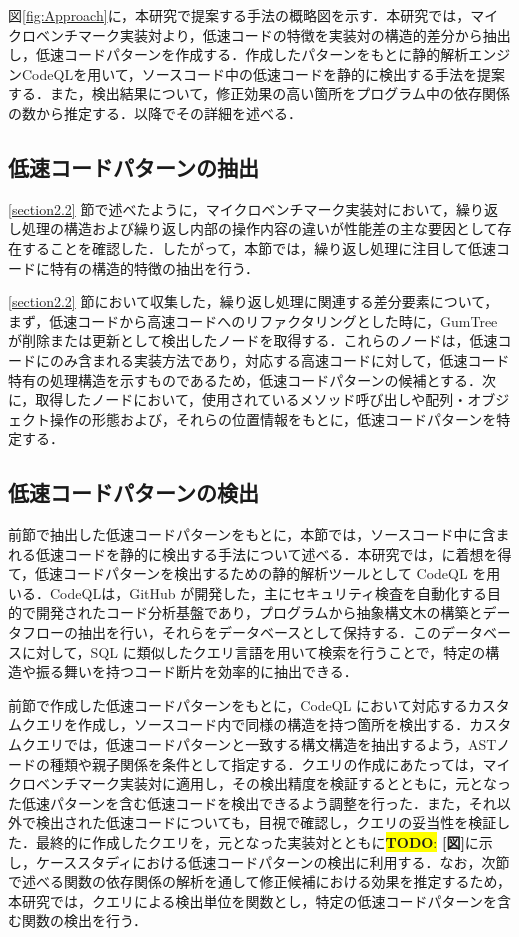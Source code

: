\documentclass[submit,techrep,noauthor]{ipsj}
\newcommand{\todo}[1]{\colorbox{yellow}{{\bf TODO}:}{\color{red} {\textbf{[#1]}}}}
\begin{document}
図\ref{fig:Approach}に，本研究で提案する手法の概略図を示す．本研究では，マイクロベンチマーク実装対より，低速コードの特徴を実装対の構造的差分から抽出し，低速コードパターンを作成する．作成したパターンをもとに静的解析エンジンCodeQL\cite{ql}を用いて，ソースコード中の低速コードを静的に検出する手法を提案する．また，検出結果について，修正効果の高い箇所をプログラム中の依存関係の数から推定する．以降でその詳細を述べる．


\subsection{低速コードパターンの抽出}

\ref{section2.2} 節で述べたように，マイクロベンチマーク実装対において，繰り返し処理の構造および繰り返し内部の操作内容の違いが性能差の主な要因として存在することを確認した．したがって，本節では，繰り返し処理に注目して低速コードに特有の構造的特徴の抽出を行う．

\ref{section2.2} 節において収集した，繰り返し処理に関連する差分要素について，まず，低速コードから高速コードへのリファクタリングとした時に，GumTree\cite{gumtree} が削除または更新として検出したノードを取得する．これらのノードは，低速コードにのみ含まれる実装方法であり，対応する高速コードに対して，低速コード特有の処理構造を示すものであるため，低速コードパターンの候補とする．次に，取得したノードにおいて，使用されているメソッド呼び出しや配列・オブジェクト操作の形態および，それらの位置情報をもとに，低速コードパターンを特定する．


\subsection{低速コードパターンの検出}

前節で抽出した低速コードパターンをもとに，本節では，ソースコード中に含まれる低速コードを静的に検出する手法について述べる．本研究では，\cite{DrAsync}に着想を得て，低速コードパターンを検出するための静的解析ツールとして CodeQL\cite{ql} を用いる．CodeQLは，GitHub が開発した，主にセキュリティ検査を自動化する目的で開発されたコード分析基盤であり，プログラムから抽象構文木の構築とデータフローの抽出を行い，それらをデータベースとして保持する．このデータベースに対して，SQL に類似したクエリ言語を用いて検索を行うことで，特定の構造や振る舞いを持つコード断片を効率的に抽出できる．

前節で作成した低速コードパターンをもとに，CodeQL において対応するカスタムクエリを作成し，ソースコード内で同様の構造を持つ箇所を検出する．カスタムクエリでは，低速コードパターンと一致する構文構造を抽出するよう，ASTノードの種類や親子関係を条件として指定する．クエリの作成にあたっては，マイクロベンチマーク実装対に適用し，その検出精度を検証するとともに，元となった低速パターンを含む低速コードを検出できるよう調整を行った．また，それ以外で検出された低速コードについても，目視で確認し，クエリの妥当性を検証した．最終的に作成したクエリを，元となった実装対とともに\todo{図}に示し，ケーススタディにおける低速コードパターンの検出に利用する．なお，次節で述べる関数の依存関係の解析を通して修正候補における効果を推定するため，本研究では，クエリによる検出単位を関数とし，特定の低速コードパターンを含む関数の検出を行う．
\end{document}
